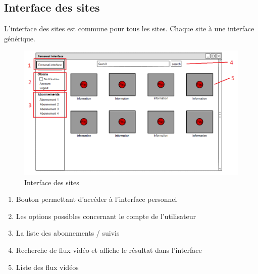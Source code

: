 \documentclass[11pt]{report} %
\begin{document}
		\newpage		
		
		\subsection{Interface des sites}
		L'interface des sites est commune pour tous les sites. Chaque site à une interface générique. 
		\begin{figure}[h]
			\center
			\includegraphics[width=1\textwidth]{../img/serviceInterfacenum.png}
			\caption{Interface des sites}
			\label{interfacesites}
		\end{figure}
		
		\begin{enumerate}
			\item Bouton permettant d'accéder à l'interface personnel
			\item Les options possibles concernant le compte de l'utilisateur
			\item La liste des abonnements / suivis 
			\item Recherche de flux vidéo et affiche le résultat dans l'interface
			\item Liste des flux vidéos
		\end{enumerate}

		\newpage
\end{document}

